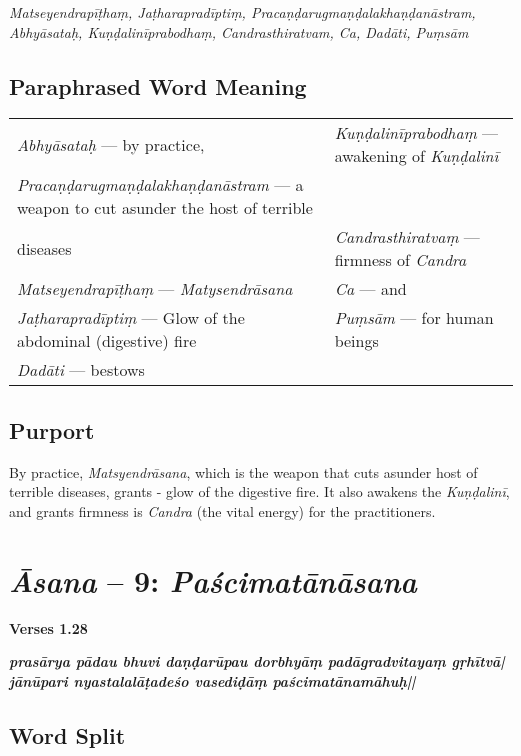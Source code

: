 \textit{Matseyendrapīṭhaṃ,  Jaṭharapradīptiṃ,  Pracaṇḍarugmaṇḍalakhaṇḍanāstram, 
Abhyāsataḥ, Kuṇḍalinīprabodhaṃ,  Candrasthiratvam, Ca, Dadāti, Puṃsām}
\newpage
\subsection*{Paraphrased Word Meaning}

\begin{longtable}{>{\noindent\raggedright}p{5cm}>{\noindent\raggedright}p{5cm}}
\textit{Abhyāsataḥ} --- by practice, & \textit{Kuṇḍalinīprabodhaṃ} --- awakening of \textit{Kuṇḍalinī}\tabularnewline
\textit{Pracaṇḍarugmaṇḍala\-khaṇḍa\-nāstram} --- a weapon to cut asunder the host  of terrible\tabularnewline 
diseases & \textit{Candrasthiratvaṃ} --- firmness  of \textit{Candra}\tabularnewline
\textit{Matseyendrapīṭhaṃ} --- \textit{Matysendrāsana} & \textit{Ca} --- and\tabularnewline
\textit{Jaṭharapradīptiṃ} --- Glow of the  abdominal (digestive) fire & \textit{Puṃsām} --- for human beings\tabularnewline
\textit{Dadāti} --- bestows & 
\end{longtable}
 
\subsection*{Purport}

By practice, \textit{Matsyendrāsana}, which is the weapon that cuts asunder host of terrible diseases, grants - glow of the digestive fire. It also awakens the  \textit{Kuṇḍalinī}, and grants firmness is \textit{Candra} (the vital energy) for the practitioners.


\section*{\textit{Āsana} -- 9: \textit{Paścimatānāsana}}

\noindent 
\textbf{Verses 1.28}

\begin{shloka}
\textit{\textbf{prasārya pādau bhuvi daṇḍarūpau dorbhyāṃ padāgradvitayaṃ gṛhītvā|}\\
\textbf{jānūpari nyastalalāṭadeśo vasediḍāṃ paścimatānamāhuḥ||}}
\end{shloka}

\subsection*{Word Split}

